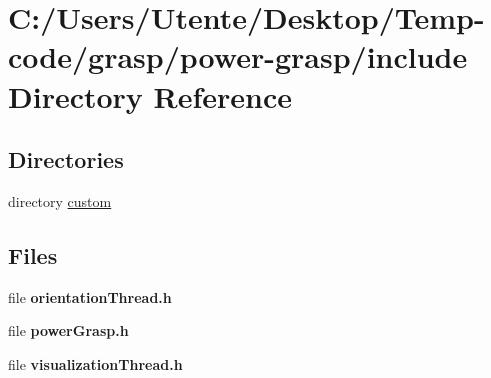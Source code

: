 \section{C\+:/\+Users/\+Utente/\+Desktop/\+Temp-\/code/grasp/power-\/grasp/include Directory Reference}
\label{dir_efb7eddc169b66b1d309372c1fedb5d2}
\subsection*{Directories}
\begin{DoxyCompactItemize}
\item 
directory \hyperlink{dir_9fc514bd13b56af195b31c2030503ad0}{custom}
\end{DoxyCompactItemize}
\subsection*{Files}
\begin{DoxyCompactItemize}
\item 
file {\bfseries orientation\+Thread.\+h}
\item 
file {\bfseries power\+Grasp.\+h}
\item 
file {\bfseries visualization\+Thread.\+h}
\end{DoxyCompactItemize}
